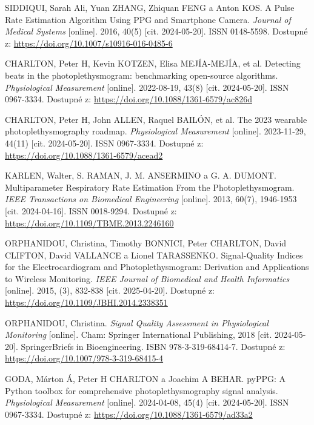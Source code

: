 \begin{thebibliography}{99}
		SIDDIQUI, Sarah Ali, Yuan ZHANG, Zhiquan FENG a Anton KOS.
		A Pulse Rate Estimation Algorithm Using PPG and Smartphone Camera.
		\emph{Journal of Medical Systems} [online].
		2016, 40(5) [cit. 2024-05-20].
		ISSN 0148-5598.
		Dostupné z: \url{https://doi.org/10.1007/s10916-016-0485-6}

		CHARLTON, Peter H, Kevin KOTZEN, Elisa MEJÍA-MEJÍA, et al.
		Detecting beats in the photoplethysmogram: benchmarking open-source algorithms.
		\emph{Physiological Measurement} [online].
		2022-08-19, 43(8) [cit. 2024-05-20].
		ISSN 0967-3334.
		Dostupné z: \url{https://doi.org/10.1088/1361-6579/ac826d}

		CHARLTON, Peter H, John ALLEN, Raquel BAILÓN, et al.
		The 2023 wearable photoplethysmography roadmap.
		\emph{Physiological Measurement} [online].
		2023-11-29, 44(11) [cit. 2024-05-20].
		ISSN 0967-3334.
		Dostupné z: \url{https://doi.org/10.1088/1361-6579/acead2}

		KARLEN, Walter, S. RAMAN, J. M. ANSERMINO a G. A. DUMONT.
		Multiparameter Respiratory Rate Estimation From the Photoplethysmogram.
		\emph{IEEE Transactions on Biomedical Engineering} [online].
		2013, 60(7), 1946-1953 [cit. 2024-04-16].
		ISSN 0018-9294.
		Dostupné z: \url{https://doi.org/10.1109/TBME.2013.2246160}

		ORPHANIDOU, Christina, Timothy BONNICI, Peter CHARLTON, David CLIFTON, David VALLANCE a Lionel TARASSENKO.
		Signal-Quality Indices for the Electrocardiogram and Photoplethysmogram: Derivation and Applications to Wireless Monitoring.
		\emph{IEEE Journal of Biomedical and Health Informatics} [online].
		2015, (3), 832-838 [cit. 2025-04-20].
		Dostupné z: \url{https://doi.org/10.1109/JBHI.2014.2338351}

		ORPHANIDOU, Christina.
		\emph{Signal Quality Assessment in Physiological Monitoring} [online].
		Cham: Springer International Publishing, 2018 [cit. 2024-05-20].
		SpringerBriefs in Bioengineering.
		ISBN 978-3-319-68414-7.
		Dostupné z: \url{https://doi.org/10.1007/978-3-319-68415-4}

		GODA, Márton Á, Peter H CHARLTON a Joachim A BEHAR.
		pyPPG: A Python toolbox for comprehensive photoplethysmography signal analysis.
		\emph{Physiological Measurement} [online].
		2024-04-08, 45(4) [cit. 2024-05-20].
		ISSN 0967-3334.
		Dostupné z: \url{https://doi.org/10.1088/1361-6579/ad33a2}


\end{thebibliography}
